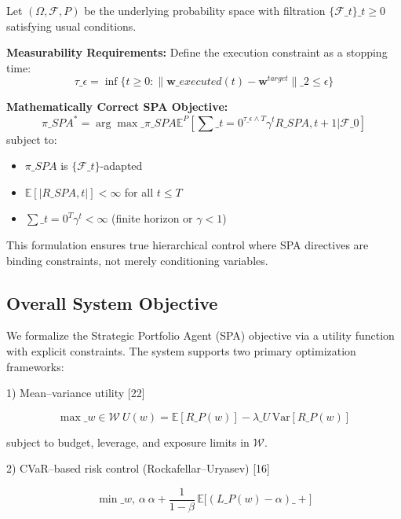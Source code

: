 \documentclass[11pt,a4paper]{article}
\begin{document}
Let $(\Omega, \mathcal{F}, P)$ be the underlying probability space with filtration $\{\mathcal{F}\_t\}\_{t \geq 0}$ satisfying usual conditions.

\textbf{Measurability Requirements:}
Define the execution constraint as a stopping time:
\begin{equation}
\tau\_\epsilon = \inf\{t \geq 0: \|\mathbf{w}\_{executed}(t) - \mathbf{w}^{target}\|\_2 \leq \epsilon\}
\end{equation}

\textbf{Mathematically Correct SPA Objective:}
\begin{equation}
\pi\_{SPA}^* = \arg\max\_{\pi\_{SPA}} \mathbb{E}^P\left[\sum\_{t=0}^{\tau\_\epsilon \wedge T} \gamma^t R\_{SPA,t+1} \Big| \mathcal{F}\_0\right]
\end{equation}
subject to:
\begin{itemize}
\item $\pi\_{SPA}$ is $\{\mathcal{F}\_t\}$-adapted
\item $\mathbb{E}[|R\_{SPA,t}|] < \infty$ for all $t \leq T$
\item $\sum\_{t=0}^T \gamma^t < \infty$ (finite horizon or $\gamma < 1$)

\end{itemize}
This formulation ensures true hierarchical control where SPA directives are binding constraints, not merely conditioning variables.

\subsection{Overall System Objective}

We formalize the Strategic Portfolio Agent (SPA) objective via a utility function with explicit constraints. The system supports two primary optimization frameworks:

1) Mean–variance utility [22]

\begin{equation}
\max\_{w\in\mathcal{W}}\ U(w) = \mathbb{E}[R\_P(w)] - \lambda\_U\,\mathrm{Var}[R\_P(w)]
\end{equation}

subject to budget, leverage, and exposure limits in $\mathcal{W}$.

2) CVaR–based risk control (Rockafellar–Uryasev) [16]

\begin{equation}
\min\_{w,\,\alpha}\ \alpha + \frac{1}{1-\beta}\,\mathbb{E}\big[(L\_P(w)-\alpha)\_+\big]
\end{equation}
\end{document}
